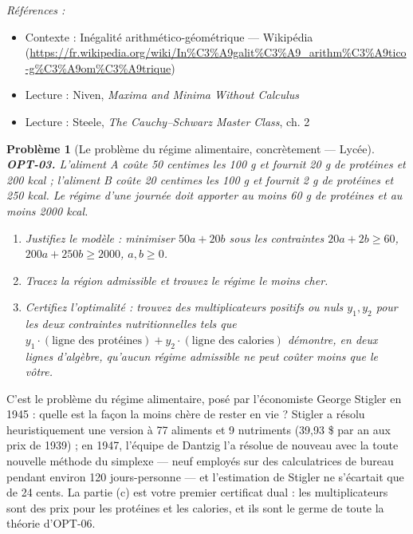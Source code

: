 \documentclass[11pt]{article}
\newtheorem{problem}{Problème}
\newenvironment{refs}{\par\small\noindent\emph{Références :}\begin{itemize}\setlength\itemsep{0pt}}{\end{itemize}\normalsize}
\begin{document}
\begin{refs}
\item Contexte : Inégalité arithmético-géométrique --- Wikipédia (\url{https://fr.wikipedia.org/wiki/In%C3%A9galit%C3%A9_arithm%C3%A9tico-g%C3%A9om%C3%A9trique})
\item Lecture : Niven, \textit{Maxima and Minima Without Calculus}
\item Lecture : Steele, \textit{The Cauchy--Schwarz Master Class}, ch. 2
\end{refs}

\bigskip

\begin{problem}[{Le problème du régime alimentaire, concrètement --- Lycée}]
\textbf{OPT-03.} L'aliment A coûte 50 centimes les 100 g et fournit 20 g de protéines et 200 kcal ; l'aliment B coûte 20 centimes les 100 g et fournit 2 g de protéines et 250 kcal. Le régime d'une journée doit apporter au moins 60 g de protéines et au moins 2000 kcal.
\begin{enumerate}
\item[(a)] Justifiez le modèle : minimiser $50a + 20b$ sous les contraintes $20a + 2b \ge 60$, $200a + 250b \ge 2000$, $a, b \ge 0$.
\item[(b)] Tracez la région admissible et trouvez le régime le moins cher.
\item[(c)] Certifiez l'optimalité : trouvez des multiplicateurs positifs ou nuls $y_1, y_2$ pour les deux contraintes nutritionnelles tels que $y_1 \cdot (\text{ligne des protéines}) + y_2 \cdot (\text{ligne des calories})$ démontre, en deux lignes d'algèbre, qu'aucun régime admissible ne peut coûter moins que le vôtre.
\end{enumerate}

\end{problem}

\noindent C'est le problème du régime alimentaire, posé par l'économiste George Stigler en 1945 : quelle est la façon la moins chère de rester en vie ? Stigler a résolu heuristiquement une version à 77 aliments et 9 nutriments (39,93 \$ par an aux prix de 1939) ; en 1947, l'équipe de Dantzig l'a résolue de nouveau avec la toute nouvelle méthode du simplexe --- neuf employés sur des calculatrices de bureau pendant environ 120 jours-personne --- et l'estimation de Stigler ne s'écartait que de 24 cents. La partie (c) est votre premier certificat dual : les multiplicateurs sont des prix pour les protéines et les calories, et ils sont le germe de toute la théorie d'OPT-06.
\end{document}
